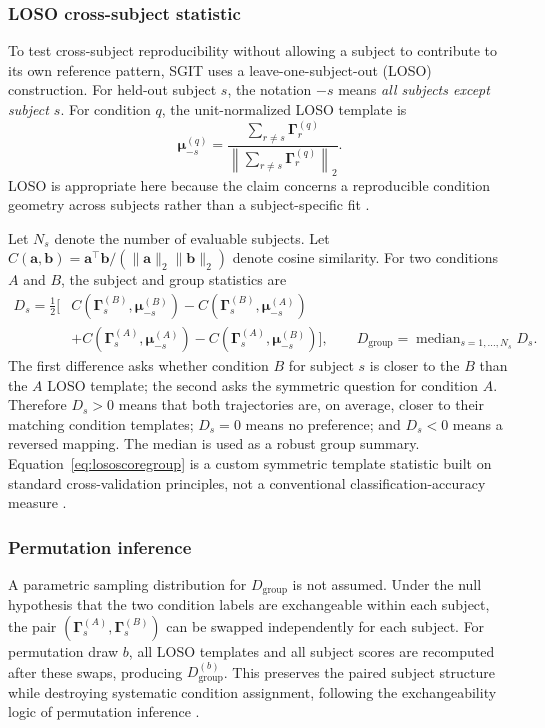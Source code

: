 \documentclass[12pt]{article}
\begin{document}
\subsubsection{LOSO cross-subject statistic}
To test cross-subject reproducibility without allowing a subject to contribute to its own reference pattern, SGIT uses a leave-one-subject-out (LOSO) construction. For held-out subject $s$, the notation $-s$ means \emph{all subjects except subject $s$}. For condition $q$, the unit-normalized LOSO template is
\begin{equation}
\bm\mu_{-s}^{(q)}=
\frac{\sum_{r\ne s}\bm\Gamma_r^{(q)}}
{\left\|\sum_{r\ne s}\bm\Gamma_r^{(q)}\right\|_2}.
\label{eq:losotemplate}
\end{equation}
LOSO is appropriate here because the claim concerns a reproducible condition geometry across subjects rather than a subject-specific fit \citep{Varoquaux2017,Ramirez2020}.

Let $N_s$ denote the number of evaluable subjects. Let $C(\bm a,\bm b)=\bm a^{\top}\bm b/(\|\bm a\|_2\|\bm b\|_2)$ denote cosine similarity. For two conditions $A$ and $B$, the subject and group statistics are
\begin{align}
D_s=\frac12\Big[&C(\bm\Gamma_s^{(B)},\bm\mu_{-s}^{(B)})-C(\bm\Gamma_s^{(B)},\bm\mu_{-s}^{(A)})\nonumber\\
&+C(\bm\Gamma_s^{(A)},\bm\mu_{-s}^{(A)})-C(\bm\Gamma_s^{(A)},\bm\mu_{-s}^{(B)})\Big],
\qquad
D_{\mathrm{group}}=\operatorname{median}_{s=1,\ldots,N_s}D_s.
\label{eq:lososcoregroup}
\end{align}
The first difference asks whether condition $B$ for subject $s$ is closer to the $B$ than the $A$ LOSO template; the second asks the symmetric question for condition $A$. Therefore $D_s>0$ means that both trajectories are, on average, closer to their matching condition templates; $D_s=0$ means no preference; and $D_s<0$ means a reversed mapping. The median is used as a robust group summary. Equation~\ref{eq:lososcoregroup} is a custom symmetric template statistic built on standard cross-validation principles, not a conventional classification-accuracy measure \citep{Varoquaux2017}.

\subsubsection{Permutation inference}
A parametric sampling distribution for $D_{\mathrm{group}}$ is not assumed. Under the null hypothesis that the two condition labels are exchangeable within each subject, the pair $(\bm\Gamma_s^{(A)},\bm\Gamma_s^{(B)})$ can be swapped independently for each subject. For permutation draw $b$, all LOSO templates and all subject scores are recomputed after these swaps, producing $D_{\mathrm{group}}^{(b)}$. This preserves the paired subject structure while destroying systematic condition assignment, following the exchangeability logic of permutation inference \citep{Winkler2014}.
\end{document}
